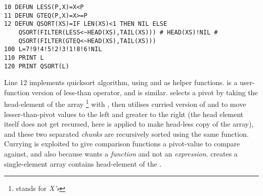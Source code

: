 \begin{lstlisting}
10 DEFUN LESS(P,X)=X<P
11 DEFUN GTEQ(P,X)=X>=P
12 DEFUN QSORT(XS)=IF LEN(XS)<1 THEN NIL ELSE 
    QSORT(FILTER(LESS<~HEAD(XS),TAIL(XS))) # HEAD(XS)!NIL # 
    QSORT(FILTER(GTEQ<~HEAD(XS),TAIL(XS)))
100 L=7!9!4!5!2!3!1!8!6!NIL
110 PRINT L
120 PRINT QSORT(L)
\end{lstlisting}

Line 12 implements quicksort algorithm, using  and  as helper functions.  is a user-function version of less-than operator, and  is similar.  selects a pivot by taking the head-element of the array \footnote{stands for \emph{X's}} with , then utilises curried version of  and  to move lesser-than-pivot values to the left and greater to the right (the head element itself does not get recursed, here  is applied to make head-less copy of the array), and these two separated \emph{chunks} are recursively sorted using the same  function. Currying is exploited to give comparison functions a pivot-value to compare against, and also because  wants a \emph{function} and not an \emph{expression}.  creates a single-element array contains head-element of the .

